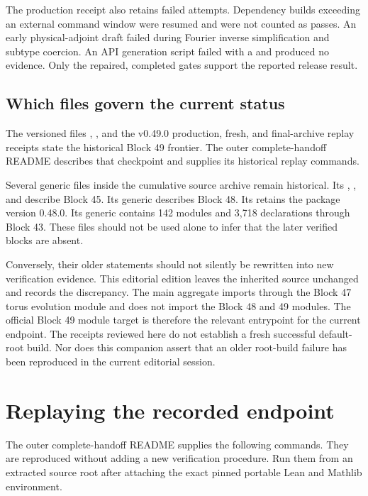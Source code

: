 The production receipt also retains failed attempts. Dependency builds exceeding an external command window were resumed and were not counted as passes. An early physical-adjoint draft failed during Fourier inverse simplification and subtype coercion. An API generation script failed with a  and produced no evidence. Only the repaired, completed gates support the reported release result.

\subsection{Which files govern the current status}

The versioned files , , and the v0.49.0 production, fresh, and final-archive replay receipts state the historical Block 49 frontier. The outer complete-handoff README describes that checkpoint and supplies its historical replay commands.

Several generic files inside the cumulative source archive remain historical. Its , , and  describe Block 45. Its generic  describes Block 48. Its  retains the package version 0.48.0. Its generic  contains 142 modules and 3,718 declarations through Block 43. These files should not be used alone to infer that the later verified blocks are absent.

Conversely, their older statements should not silently be rewritten into new verification evidence. This editorial edition leaves the inherited source unchanged and records the discrepancy. The main aggregate  imports through the Block 47 torus evolution module and does not import the Block 48 and 49 modules. The official Block 49 module target is therefore the relevant entrypoint for the current endpoint. The receipts reviewed here do not establish a fresh successful default-root build. Nor does this companion assert that an older root-build failure has been reproduced in the current editorial session.

\section{Replaying the recorded endpoint}

The outer complete-handoff README supplies the following commands. They are reproduced without adding a new verification procedure. Run them from an extracted source root after attaching the exact pinned portable Lean and Mathlib environment.


